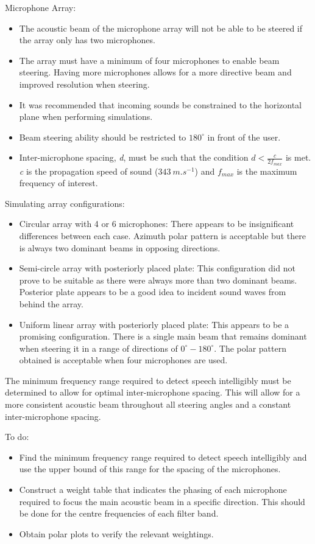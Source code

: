 \documentclass[10pt,onecolumn]{witseiepaper}
\begin{document}
Microphone Array:
\begin{itemize}
	\item The acoustic beam of the microphone array will not be able to be steered if the array only has two microphones.
	\item The array must have a minimum of four microphones to enable beam steering. Having more microphones allows for a more directive beam and improved resolution when steering.
	\item It was recommended that incoming sounds be constrained to the horizontal plane when performing simulations.
	\item Beam steering ability should be restricted to $180^{\circ}$ in front of the user.
	\item Inter-microphone spacing, \textit{d}, must be such that  the condition $d<\frac{c}{2 f_{max}}$ is met. \textit{c} is the propagation speed of sound ($343~m.s^{-1}$) and $f_{max}$ is the maximum frequency of interest.
\end{itemize}

Simulating array configurations:
\begin{itemize}
	\item Circular array with 4 or 6 microphones: There appears to be insignificant differences between each case. Azimuth polar pattern is acceptable but there is always two dominant beams in opposing directions.
	\item Semi-circle array with posteriorly placed plate: This configuration did not prove to be suitable as there were always more than two dominant beams. Posterior plate appears to be a good idea to incident sound waves from behind the array.
	\item Uniform linear array with posteriorly placed plate: This appears to be a promising configuration. There is a single main beam that remains dominant when steering it in a range of directions of $0^{\circ}-180^{\circ}$. The polar pattern obtained is acceptable when four microphones are used.
\end{itemize}

The minimum frequency range required to detect speech intelligibly must be determined to allow for optimal inter-microphone spacing. This will allow for a more consistent acoustic beam throughout all steering angles and a constant inter-microphone spacing.

To do:
\begin{itemize}
	\item Find the minimum frequency range required to detect speech intelligibly and use the upper bound of this range for the spacing of the microphones.
	\item Construct a weight table that indicates the phasing of each microphone required to focus the main acoustic beam in a specific direction. This should be done for the centre frequencies of each filter band.
	\item Obtain polar plots to verify the relevant weightings.
\end{itemize}
\end{document}

